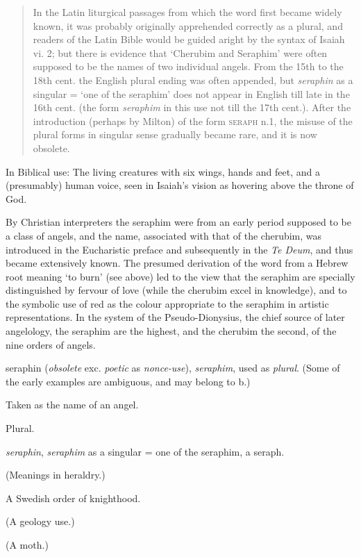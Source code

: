 \begin{quote}
				In the Latin liturgical passages from which the word first became widely known, it was probably originally apprehended correctly as a plural, and readers of the Latin Bible would be guided aright by the syntax of Isaiah vi. 2; but there is evidence that `Cherubim and Seraphim' were often supposed to be the names of two individual angels. From the 15th to the 18th cent. the English plural ending was often appended, but \textit{seraphin} as a singular = `one of the seraphim' does not appear in English till late in the 16th cent. (the form \textit{seraphim} in this use not till the 17th cent.). After the introduction (perhaps by Milton) of the form \textsc{seraph} n.1, the misuse of the plural forms in singular sense gradually became rare, and it is now obsolete.
			\end{quote}
	
		\begin{compactitem}
			\item[1] In Biblical use: The living creatures with six wings, hands and feet, and a (presumably) human voice, seen in Isaiah's vision as hovering above the throne of God.
			\item[2] By Christian interpreters the seraphim were from an early period supposed to be a class of angels, and the name, associated with that of the cherubim, was introduced in the Eucharistic preface and subsequently in the \textit{Te Deum}, and thus became extensively known. The presumed derivation of the word from a Hebrew root meaning `to burn' (see above) led to the view that the seraphim are specially distinguished by fervour of love (while the cherubim excel in knowledge), and to the symbolic use of red as the colour appropriate to the seraphim in artistic representations. In the system of the Pseudo-Dionysius, the chief source of later angelology, the seraphim are the highest, and the cherubim the second, of the nine orders of angels.
			\item[2.a] seraphin (\textit{obsolete} exc. \textit{poetic} as \textit{nonce-use}), \textit{seraphim}, used as \textit{plural}. (Some of the early examples are ambiguous, and may belong to b.)
			\item[2.b] Taken as the name of an angel.
			\item[2.c] Plural.
			\item[2.d] \textit{seraphin}, \textit{seraphim} as a singular = one of the seraphim, a seraph.
			\item[3] (Meanings in heraldry.)
			\item[4] A Swedish order of knighthood.
			\item[5] (A geology use.)
			\item[6] (A moth.)
		\end{compactitem}
	
